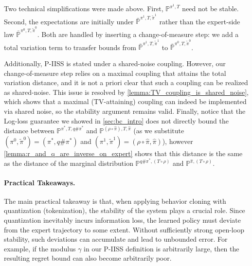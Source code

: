 \documentclass{article}
\let\oldparagraph\paragraph
\renewcommand{\paragraph}[1]{\oldparagraph{#1.}}
\begin{document}
Two technical simplifications were made above. First, $\mathbb P^{\pi^1, T}$ need not be stable. Second, the expectations are initially under $\bar{\mathbb P}^{\pi^1,T,\tilde \pi^1}$ rather than the expert-side law $\bar{\mathbb P}^{\pi^0,T,\tilde \pi^0}$. Both are handled by inserting a change-of-measure step: we add a total variation term to transfer bounds from $\bar{\mathbb P}^{\pi^1,T,\tilde \pi^1}$ to $\bar{\mathbb P}^{\pi^0,T,\tilde \pi^0}$.

Additionally, P-IISS is stated under a shared-noise coupling. However, our change-of-measure step relies on a maximal coupling that attains the total variation distance, and it is not a priori clear that such a coupling can be realized as shared-noise. This issue is resolved by \cref{lemma:TV_coupling_is_shared_noise}, which shows that a maximal (TV-attaining) coupling can indeed be implemented via shared noise, so the stability argument remains valid. Finally, notice that the Log-loss guarantee we showed in \cref{sec:bc_intro} does not directly bound the distance between $\mathbb P^{\pi^*, T, q\#\pi^*}$ and $\mathbb P^{(\rho \circ \hat \pi),T, \hat \pi}$ (as we substitute $(\pi^0,\tilde\pi^0)=(\pi^*,q\#\pi^*)$ and $(\pi^1,\tilde\pi^1)=(\rho\circ\hat\pi,\hat\pi)$), however  \cref{lemma:r_and_q_are_inverse_on_expert} shows that this distance is the same as the distance of the marginal distribution $\mathbb P^{q\#\pi^*,(T\circ \rho)}$ and $\mathbb P^{\hat \pi,(T\circ \rho)}$. 


\paragraph{Practical Takeaways}
The main practical takeaway is that, when applying behavior cloning with quantization (tokenization), the stability of the system plays a crucial role. Since quantization inevitably incurs information loss, the learned policy must deviate from the expert trajectory to some extent. Without sufficiently strong open-loop stability, such deviations can accumulate and lead to unbounded error. For example, if the modulus $\gamma$ in our P-IISS definition is arbitrarily large, then the resulting regret bound can also become arbitrarily poor.
\end{document}
